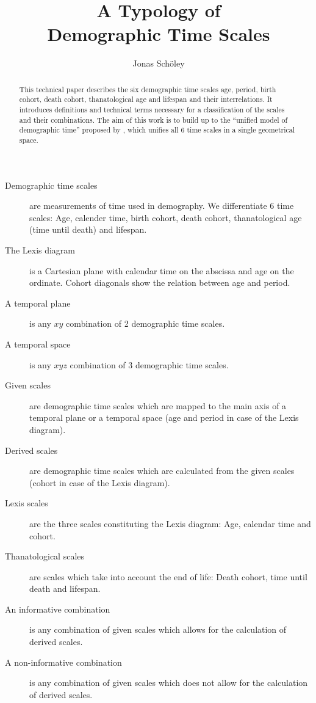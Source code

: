 \documentclass[
  12pt
]{scrartcl}
\title{A Typology of \\Demographic Time Scales}
\author{Jonas Schöley}
\begin{document}
\maketitle

\begin{abstract}
This technical paper describes the six demographic time scales age, period, birth cohort, death cohort, thanatological age and lifespan and their interrelations. It introduces definitions and technical terms necessary for a classification of the scales and their combinations. The aim of this work is to build up to the \enquote{unified model of demographic time} proposed by \cite{Riffe2015}, which unifies all 6 time scales in a single geometrical space.
\end{abstract}


\begin{description}
  \item[Demographic time scales] are measurements of time used in demography. We differentiate 6 time scales: Age, calender time, birth cohort, death cohort, thanatological age (time until death) and lifespan.
  \item[The Lexis diagram] is a Cartesian plane with calendar time on the abscissa and age on the ordinate. Cohort diagonals show the relation between age and period.
  \item[A temporal plane] is any $xy$ combination of 2 demographic time scales.
  \item[A temporal space] is any $xyz$ combination of 3 demographic time scales.
  \item[Given scales] are demographic time scales which are mapped to the main axis of a temporal plane or a temporal space (age and period in case of the Lexis diagram).
  \item[Derived scales] are demographic time scales which are calculated from the given scales (cohort in case of the Lexis diagram).
  \item[Lexis scales] are the three scales constituting the Lexis diagram: Age, calendar time and cohort.
  \item[Thanatological scales] are scales which take into account the end of life: Death cohort, time until death and lifespan.
  \item[An informative combination] is any combination of given scales which allows for the calculation of derived scales.
  \item[A non-informative combination] is any combination of given scales which does not allow for the calculation of derived scales.
\end{description}
\end{document}

